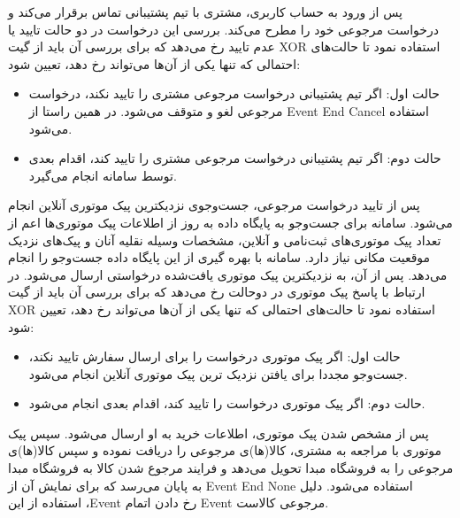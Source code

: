 \documentclass[14pt]{article}
\begin{document}
پس از ورود به حساب کاربری، مشتری با تیم پشتیبانی تماس برقرار می‌کند و درخواست مرجوعی خود را مطرح می‌کند. بررسی این درخواست در دو حالت تایید یا عدم تایید رخ می‌دهد که برای بررسی آن باید از گیت XOR استفاده نمود تا حالت‌های احتمالی که تنها یکی از آن‌ها می‌تواند رخ دهد، تعیین شود:

\begin{flushright}
\begin{itemize}
\item حالت اول: اگر تیم پشتیبانی درخواست مرجوعی مشتری را تایید نکند، درخواست مرجوعی لغو و متوقف می‌شود. در همین راستا از Event End Cancel استفاده می‌شود.
\item حالت دوم: اگر تیم پشتیبانی درخواست مرجوعی مشتری را تایید کند، اقدام بعدی توسط سامانه انجام می‌گیرد.
\end{itemize}
\end{flushright}

پس از تایید درخواست مرجوعی، جست‌وجوی نزدیکترین پیک موتوری آنلاین انجام می‌شود. سامانه برای جست‌و‌جو به پایگاه داده به روز از اطلاعات پیک موتوری‌ها اعم از تعداد پیک موتوری‌های ثبت‌نامی و آنلاین، مشخصات وسیله نقلیه آنان و پیک‌های نزدیک موقعیت مکانی نیاز دارد. سامانه با بهره گیری از این پایگاه داده جست‌و‌جو را انجام می‌دهد. پس از آن، به نزدیکترین پیک موتوری یافت‌شده درخواستی ارسال می‌شود. در ارتباط با پاسخ پیک موتوری در دوحالت رخ می‌دهد که برای بررسی آن باید از گیت XOR استفاده نمود تا حالت‌های احتمالی که تنها یکی از آن‌ها می‌تواند رخ دهد، تعیین شود:

\begin{flushright}
\begin{itemize}
\item حالت اول: اگر پیک موتوری درخواست را برای ارسال سفارش تایید نکند، جست‌و‌جو مجددا برای یافتن نزدیک ترین پیک موتوری آنلاین انجام می‌شود.
\item حالت دوم: اگر پیک موتوری درخواست را تایید کند، اقدام بعدی انجام می‌شود.
\end{itemize}
\end{flushright}

پس از مشخص شدن پیک موتوری، اطلاعات خرید به او ارسال می‌شود. سپس پیک موتوری با مراجعه به مشتری، کالا(ها)ی مرجوعی را دریافت نموده و سپس کالا(ها)ی مرجوعی را به فروشگاه مبدا تحویل می‌دهد و فرایند مرجوع شدن کالا به فروشگاه مبدا به پایان می‌رسد که برای نمایش آن از Event End None استفاده می‌شود. دلیل استفاده از این ،Event رخ دادن اتمام Event مرجوعی کالاست. 
\end{document}
